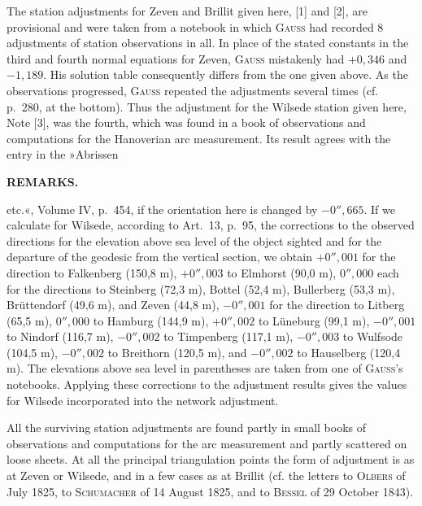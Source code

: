 The station adjustments for Zeven and Brillit given here, [1] and [2], are provisional and were taken from a notebook in which \textsc{Gauss} had recorded 8 adjustments of station observations in all. In place of the stated constants in the third and fourth normal equations for Zeven, \textsc{Gauss} mistakenly had \(+0{,}346\) and \(-1{,}189\). His solution table consequently differs from the one given above. As the observations progressed, \textsc{Gauss} repeated the adjustments several times (cf. p.~280, at the bottom). Thus the adjustment for the Wilsede station given here, Note [3], was the fourth, which was found in a book of observations and computations for the Hanoverian arc measurement. Its result agrees with the entry in the »Abrissen

\par\clearpage
\noindent{}\hfill{\small\textbf{REMARKS.}}\hfill\null\par\medskip

\noindent etc.«, Volume IV, p.~454, if the orientation here is changed by \(-0''{,}665\). If we calculate for Wilsede, according to Art.~13, p.~95, the corrections to the observed directions for the elevation above sea level of the object sighted and for the departure of the geodesic from the vertical section, we obtain \(+0''{,}001\) for the direction to Falkenberg (150,8 m), \(+0''{,}003\) to Elmhorst (90,0 m), \(0''{,}000\) each for the directions to Steinberg (72,3 m), Bottel (52,4 m), Bullerberg (53,3 m), Brüttendorf (49,6 m), and Zeven (44,8 m), \(-0''{,}001\) for the direction to Litberg (65,5 m), \(0''{,}000\) to Hamburg (144,9 m), \(+0''{,}002\) to Lüneburg (99,1 m), \(-0''{,}001\) to Nindorf (116,7 m), \(-0''{,}002\) to Timpenberg (117,1 m), \(-0''{,}003\) to Wulfsode (104,5 m), \(-0''{,}002\) to Breithorn (120,5 m), and \(-0''{,}002\) to Hauselberg (120,4 m). The elevations above sea level in parentheses are taken from one of \textsc{Gauss}'s notebooks. Applying these corrections to the adjustment results gives the values for Wilsede incorporated into the network adjustment.

All the surviving station adjustments are found partly in small books of observations and computations for the arc measurement and partly scattered on loose sheets. At all the principal triangulation points the form of adjustment is as at Zeven or Wilsede, and in a few cases as at Brillit (cf. the letters to \textsc{Olbers} of July 1825, to \textsc{Schumacher} of 14 August 1825, and to \textsc{Bessel} of 29 October 1843).

